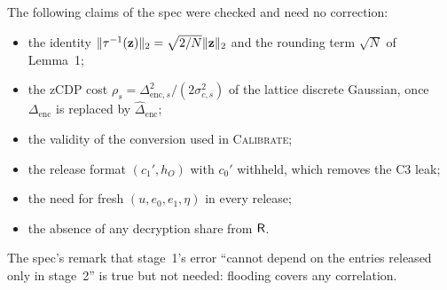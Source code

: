 \begin{remark}
The following claims of the spec were checked and need no correction:
\begin{itemize}[nosep]
  \item the identity $\lVert \tau^{-1}(\mathbf z)\rVert_2=\sqrt{2/N}\lVert \mathbf z\rVert_2$ and the rounding term $\sqrt N$ of Lemma~1;
  \item the zCDP cost $\rho_s=\Delta_{\mathrm{enc},s}^2/(2\sigma_{c,s}^2)$ of the lattice discrete Gaussian, once $\Delta_{\mathrm{enc}}$ is replaced by $\widehat\Delta_{\mathrm{enc}}$;
  \item the validity of the conversion used in \textsc{Calibrate};
  \item the release format $(c_1',h_O)$ with $c_0'$ withheld, which removes the C3 leak;
  \item the need for fresh $(u,e_0,e_1,\eta)$ in every release;
  \item the absence of any decryption share from $\mathsf{R}$.
\end{itemize}
The spec's remark that stage~1's error ``cannot depend on the entries released only in stage~2'' is true but not needed: flooding covers any correlation.
\end{remark}
